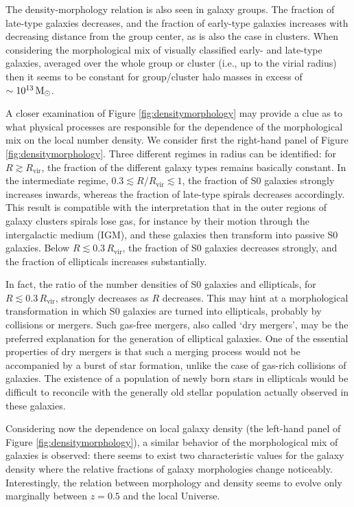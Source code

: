 \documentclass[a4paper,10pt]{article}
\begin{document}
{\noindent}The density-morphology relation is also seen in galaxy groups. The fraction of late-type galaxies decreases, and the fraction of early-type galaxies increases with decreasing distance from the group center, as is also the case in clusters. When considering the morphological mix of visually classified early- and late-type galaxies, averaged over the whole group or cluster (i.e., up to the virial radius) then it seems to be constant for group/cluster halo masses in excess of $\sim10^{13}\,{\rm M_\odot}$.

{\noindent}A closer examination of Figure \ref{fig:densitymorphology} may provide a clue as to what physical processes are responsible for the dependence of the morphological mix on the local number density. We consider first the right-hand panel of Figure \ref{fig:densitymorphology}. Three different regimes in radius can be identified: for $R\gtrsim R_\mathrm{vir}$, the fraction of the different galaxy types remains basically constant. In the intermediate regime, $0.3\lesssim R/R_\mathrm{vir}\lesssim1$, the fraction of S0 galaxies strongly increases inwards, whereas the fraction of late-type spirals decreases accordingly. This result is compatible with the interpretation that in the outer regions of galaxy clusters spirals lose gas, for instance by their motion through the intergalactic medium (IGM), and these galaxies then transform into passive S0 galaxies. Below $R\lesssim0.3\,R_\mathrm{vir}$, the fraction of S0 galaxies decreases strongly, and the fraction of ellipticals increases substantially.

{\noindent}In fact, the ratio of the number densities of S0 galaxies and ellipticals, for $R\lesssim0.3\,R_\mathrm{vir}$, strongly decreases as $R$ decreases. This may hint at a morphological transformation in which S0 galaxies are turned into ellipticals, probably by collisions or mergers. Such gas-free mergers, also called `dry mergers', may be the preferred explanation for the generation of elliptical galaxies. One of the essential properties of dry mergers is that such a merging process would not be accompanied by a burst of star formation, unlike the case of gas-rich collisions of galaxies. The existence of a population of newly born stars in ellipticals would be difficult to reconcile with the generally old stellar population actually observed in these galaxies.

{\noindent}Considering now the dependence on local galaxy density (the left-hand panel of Figure \ref{fig:densitymorphology}), a similar behavior of the morphological mix of galaxies is observed: there seems to exist two characteristic values for the galaxy density where the relative fractions of galaxy morphologies change noticeably. Interestingly, the relation between morphology and density seems to evolve only marginally between $z=0.5$ and the local Universe.
\end{document}
